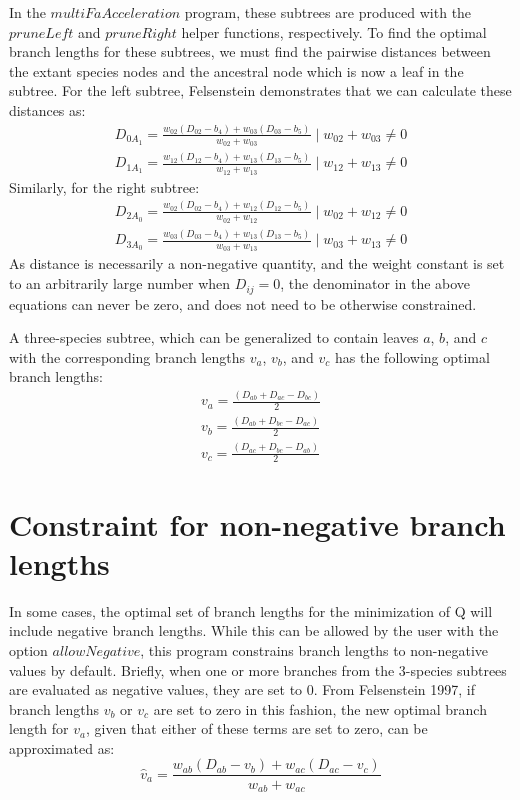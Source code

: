 \documentclass{article} %
\begin{document}
In the $multiFaAcceleration$ program, these subtrees are produced with the $pruneLeft$ and $pruneRight$ helper functions, respectively. To find the optimal branch lengths for these subtrees, we must find the pairwise distances between the extant species nodes and the ancestral node which is now a leaf in the subtree. For the left subtree, Felsenstein demonstrates that we can calculate these distances as:
\begin{equation*}
\begin{split}
	D_{0A_1} = \frac{w_{02}(D_{02} - b_4) + w_{03}(D_{03} - b_5)}{w_{02} + w_{03}} \mid w_{02} + w_{03} \ne 0 \\
	D_{1A_1} = \frac{w_{12}(D_{12} - b_4) + w_{13}(D_{13} - b_5)}{w_{12} + w_{13}} \mid w_{12} + w_{13} \ne 0
\end{split}
\end{equation*}
Similarly, for the right subtree:
\begin{equation*}
\begin{split}
	D_{2A_0} = \frac{w_{02}(D_{02} - b_4) + w_{12}(D_{12} - b_5)}{w_{02} + w_{12}} \mid w_{02} + w_{12} \ne 0\\
	D_{3A_0} = \frac{w_{03}(D_{03} - b_4) + w_{13}(D_{13} - b_5)}{w_{03} + w_{13}} \mid w_{03} + w_{13} \ne 0
\end{split}
\end{equation*}
As distance is necessarily a non-negative quantity, and the weight constant is set to an arbitrarily large number when $D_{ij} = 0$, the denominator in the above equations can never be zero, and does not need to be otherwise constrained.\par
A three-species subtree, which can be generalized to contain leaves $a$, $b$, and $c$ with the corresponding branch lengths $v_a$, $v_b$, and $v_c$ has the following optimal branch lengths:
\begin{equation*}
\begin{split}
v_a = \frac{(D_{ab} + D_{ac} - D_{bc})}{2}\\
v_b = \frac{(D_{ab} + D_{bc} - D_{ac})}{2}\\
v_c = \frac{(D_{ac} + D_{bc} - D_{ab})}{2}
\end{split}
\end{equation*}

\section{Constraint for non-negative branch lengths}
In some cases, the optimal set of branch lengths for the minimization of Q will include negative branch lengths. While this can be allowed by the user with the option $allowNegative$, this program constrains branch lengths to non-negative values by default. Briefly, when one or more branches from the 3-species subtrees are evaluated as negative values, they are set to 0. From Felsenstein 1997, if branch lengths $v_b$ or $v_c$ are set to zero in this fashion, the new optimal branch length for $v_a$, given that either of these terms are set to zero, can be approximated as:
\begin{equation*}
	\hat v_a = \frac{w_{ab}(D_{ab} - v_b) + w_{ac}(D_{ac} - v_c)}{w_{ab} + w_{ac}}
\end{equation*}
\end{document}
